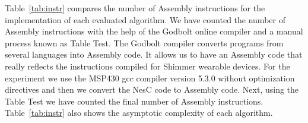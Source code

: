 


Table~\ref{tab:instr} compares the number of Assembly instructions for the implementation of each evaluated algorithm. We have counted the number of Assembly instructions with the help of the Godbolt online compiler and a manual process known as Table Test. The Godbolt compiler converts programs from several languages into Assembly code. It allows us to have an Assembly code that really reflects the instructions compiled for Shimmer wearable devices. For the experiment we use the MSP430 gcc compiler version 5.3.0 without optimization directives and then we convert the NesC code to Assembly code. Next, using the Table Test we have counted the final number of Assembly instructions. Table~\ref{tab:instr} also shows the asymptotic complexity of each algorithm.%


